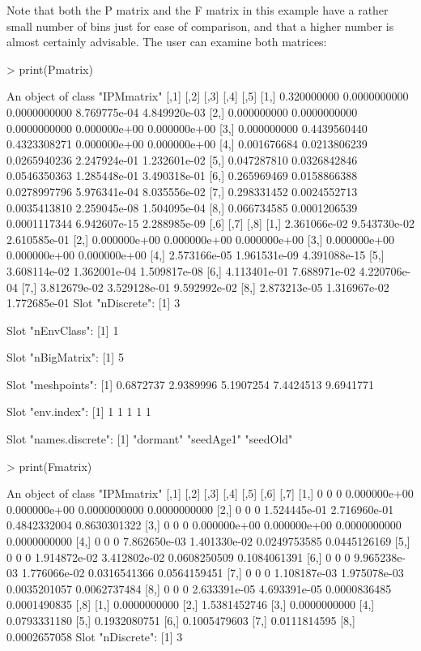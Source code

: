 \documentclass{article}
\begin{document}
Note that both the P matrix and the F matrix in this example have a rather small number of bins just for ease of comparison, and that a higher number is almost certainly advisable. The user can examine both matrices: 
\begin{Schunk}
\begin{Sinput}
> print(Pmatrix)
\end{Sinput}
\begin{Soutput}
An object of class "IPMmatrix"
            [,1]         [,2]         [,3]         [,4]         [,5]
[1,] 0.320000000 0.0000000000 0.0000000000 8.769775e-04 4.849920e-03
[2,] 0.000000000 0.0000000000 0.0000000000 0.000000e+00 0.000000e+00
[3,] 0.000000000 0.4439560440 0.4323308271 0.000000e+00 0.000000e+00
[4,] 0.001676684 0.0213806239 0.0265940236 2.247924e-01 1.232601e-02
[5,] 0.047287810 0.0326842846 0.0546350363 1.285448e-01 3.490318e-01
[6,] 0.265969469 0.0158866388 0.0278997796 5.976341e-04 8.035556e-02
[7,] 0.298331452 0.0024552713 0.0035413810 2.259045e-08 1.504095e-04
[8,] 0.066734585 0.0001206539 0.0001117344 6.942607e-15 2.288985e-09
             [,6]         [,7]         [,8]
[1,] 2.361066e-02 9.543730e-02 2.610585e-01
[2,] 0.000000e+00 0.000000e+00 0.000000e+00
[3,] 0.000000e+00 0.000000e+00 0.000000e+00
[4,] 2.573166e-05 1.961531e-09 4.391088e-15
[5,] 3.608114e-02 1.362001e-04 1.509817e-08
[6,] 4.113401e-01 7.688971e-02 4.220706e-04
[7,] 3.812679e-02 3.529128e-01 9.592992e-02
[8,] 2.873213e-05 1.316967e-02 1.772685e-01
Slot "nDiscrete":
[1] 3

Slot "nEnvClass":
[1] 1

Slot "nBigMatrix":
[1] 5

Slot "meshpoints":
[1] 0.6872737 2.9389996 5.1907254 7.4424513 9.6941771

Slot "env.index":
[1] 1 1 1 1 1

Slot "names.discrete":
[1] "dormant"  "seedAge1" "seedOld" 
\end{Soutput}
\begin{Sinput}
> print(Fmatrix)
\end{Sinput}
\begin{Soutput}
An object of class "IPMmatrix"
     [,1] [,2] [,3]         [,4]         [,5]         [,6]         [,7]
[1,]    0    0    0 0.000000e+00 0.000000e+00 0.0000000000 0.0000000000
[2,]    0    0    0 1.524445e-01 2.716960e-01 0.4842332004 0.8630301322
[3,]    0    0    0 0.000000e+00 0.000000e+00 0.0000000000 0.0000000000
[4,]    0    0    0 7.862650e-03 1.401330e-02 0.0249753585 0.0445126169
[5,]    0    0    0 1.914872e-02 3.412802e-02 0.0608250509 0.1084061391
[6,]    0    0    0 9.965238e-03 1.776066e-02 0.0316541366 0.0564159451
[7,]    0    0    0 1.108187e-03 1.975078e-03 0.0035201057 0.0062737484
[8,]    0    0    0 2.633391e-05 4.693391e-05 0.0000836485 0.0001490835
             [,8]
[1,] 0.0000000000
[2,] 1.5381452746
[3,] 0.0000000000
[4,] 0.0793331180
[5,] 0.1932080751
[6,] 0.1005479603
[7,] 0.0111814595
[8,] 0.0002657058
Slot "nDiscrete":
[1] 3


\end{Soutput}
\end{Schunk}
\end{document}
